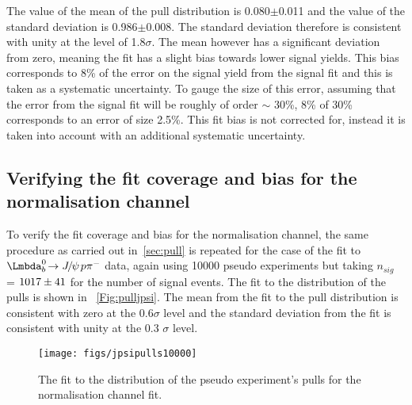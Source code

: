 The value of the mean of the pull distribution is 0.080$\pm$0.011 and the value of the standard deviation is 0.986$\pm$0.008. The standard deviation therefore is consistent with unity at the level of 1.8$\sigma$. The mean however has a significant deviation from zero, meaning the fit has a slight bias towards lower signal yields. This bias corresponds to 8\% of the error on the signal yield from the signal fit and this is taken as a systematic uncertainty. To gauge the size of this error, assuming that the error from the signal fit will be roughly of order $\sim$ 30\%, 8\% of 30\% corresponds to an error of size 2.5\%.  This fit bias is not corrected for, instead it is taken into account with an additional systematic uncertainty.
\subsection{Verifying the fit coverage and bias for the normalisation channel}
To verify the fit coverage and bias for the normalisation channel, the same procedure as carried out in~\autoref{sec:pull} is repeated for the case of the fit to $\Lbpijpsi$ data, again using 10000 pseudo experiments but taking $n_{sig}$ = $1017\pm41$ for the number of signal events. The fit to the distribution of the pulls is shown in ~\autoref{Fig:pulljpsi}. The mean from the fit to the pull distribution is consistent with zero at the 0.6$\sigma$ level and the standard deviation from the fit is consistent with unity at the 0.3 $\sigma$ level.
\begin{figure}[h!]
  \def\nh{0.7\textwidth}
  \centering
  \hspace*{-1.0cm}
  \texttt{[image: figs/jpsipulls10000]}
\caption{The fit to the distribution of the pseudo experiment's pulls for the normalisation channel fit. }%
  \label{Fig:pulljpsi}
\end{figure}



